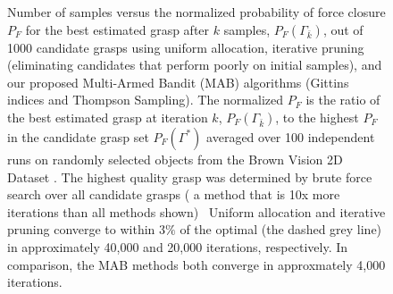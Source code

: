 \documentclass[10pt, conference]{ieeeconf}      %
\begin{document}
\begin{figure}
    \caption{Number of samples versus the normalized probability of force closure $P_F$ for the best estimated grasp after $k$ samples, $P_F(\Gamma_{\bar{k}})$, out of 1000 candidate grasps using uniform allocation, iterative pruning (eliminating candidates that perform poorly on initial samples), and our proposed Multi-Armed Bandit (MAB) algorithms (Gittins indices and Thompson Sampling).
    The normalized $P_F$ is the ratio of the best estimated grasp at iteration $k$, $P_F(\Gamma_{\bar{k}})$, to the highest $P_F$ in the candidate grasp set $P_F(\Gamma^*)$ averaged over 100 independent runs on randomly selected objects from the Brown Vision 2D Dataset \cite{brown}.
    The highest quality grasp was determined by brute force search over all candidate grasps ( a method that is 10x more iterations than all methods shown)~\cite{kehoe2012toward} 
    Uniform allocation and iterative pruning converge to within 3$\%$ of the optimal (the dashed grey line) in approximately 40,000 and 20,000 iterations, respectively.
    In comparison, the MAB methods both converge in approxmately 4,000 iterations. 
%    
	}
    \label{fig:grasp_quality}
\end{figure}
\end{document}
